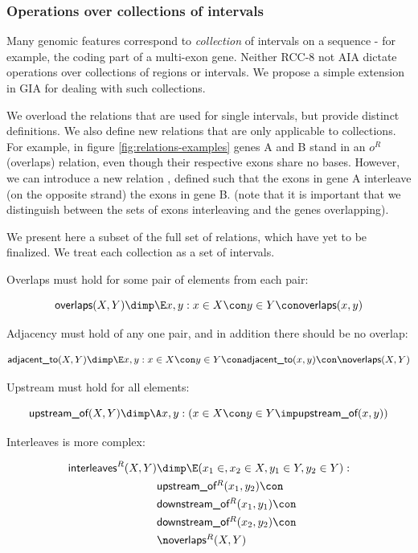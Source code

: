 \documentclass{article}
\def\upstreamOf{\pr{upstream\_of}}
\def\upstreamOfRC{\pr{upstream\_of$^{R}$}}
\def\downstreamOfRC{\pr{downstream\_of$^{R}$}}
\def\adjacentTo{\pr{adjacent\_to}}
\def\interleaves{\pr{interleaves}}
\def\interleavesR{\pr{interleaves$^{R}$}}
\def\overlaps{\pr{overlaps}}
\def\overlapsRC{\pr{overlaps$^{R}$}}
\begin{document}
\subsubsection{Operations over collections of intervals}

Many genomic features correspond to \emph{collection} of intervals on
a sequence - for example, the coding part of a multi-exon gene.
Neither RCC-8 not AIA dictate operations over collections of regions
or intervals. We propose a simple extension in GIA for dealing with
such collections.

We overload the relations that are used for single intervals, but
provide distinct definitions. We also define new relations that
are only applicable to collections. For example, in figure
\ref{fig:relations-examples} genes A and B stand in an $o^{R}$
(overlaps) relation, even though their respective exons share no
bases. However, we can introduce a new relation \interleavesR, defined
such that the exons in gene A interleave (on the opposite strand) the
exons in gene B. (note that it is important that we distinguish
between the sets of exons interleaving and the genes overlapping).

We present here a subset of the full set of relations, which have yet
to be finalized. We treat each collection as a set of intervals.

Overlaps must hold for some pair of elements from each pair:

$$\overlaps(X,Y) \dimp \E x,y : x \in X \con y \in Y \con \overlaps(x,y) $$

Adjacency must hold of any one pair, and in addition there should be no overlap:

$$\adjacentTo(X,Y) \dimp \E x,y : x \in X \con y \in Y \con \adjacentTo(x, y) \con \n \overlaps(X,Y)$$

Upstream must hold for all elements:

$$\upstreamOf(X,Y) \dimp \A x,y : (x \in X \con y \in Y \imp \upstreamOf(x,y) )$$

Interleaves is more complex:

\begin{equation*}\begin{split}
\interleaves^{R}(X,Y) & \dimp \E (x_1 \in ,x_2 \in X,y_1 \in Y,y_2 \in Y) : \\
& \upstreamOfRC(x_1,  y_2) \con \\
& \downstreamOfRC(x_1, y_1) \con \\
& \downstreamOfRC( x_2, y_2) \con \\
& \n \overlapsRC(X, Y)\\
\end{split}\end{equation*}
\end{document}
